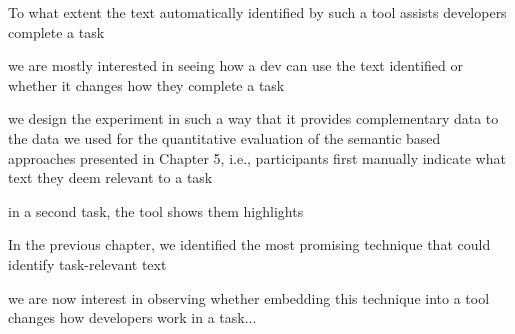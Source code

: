 
























\clearpage



To what extent the text automatically identified by such a tool assists developers complete a task


we are mostly interested in seeing how a dev can use the text identified or whether it changes how they complete a task



we design the experiment in such a way that it provides complementary data to the data we used for the quantitative evaluation 
of the semantic based approaches presented in Chapter 5, i.e., participants first manually indicate what text they deem relevant to a task

in a second task, the tool shows them highlights



In the previous chapter, we identified the most promising technique that could identify task-relevant text 


we are now interest in observing whether embedding this technique into a tool changes how developers work in a task...



